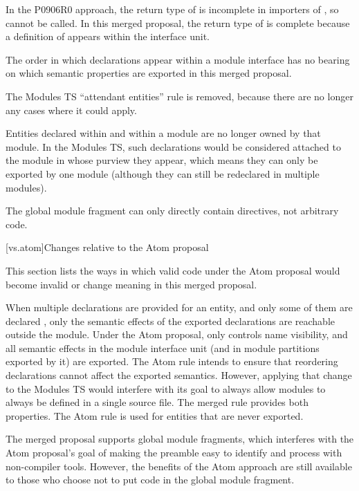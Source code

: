 In the P0906R0 approach,
the return type of  is incomplete
in importers of ,
so  cannot be called.
In this merged proposal,
the return type of  is complete
because a definition of 
appears within the interface unit.
\begin{note}
The order in which declarations appear within a module interface
has no bearing on which semantic properties are exported
in this merged proposal.
\end{note}

The Modules TS ``attendant entities'' rule is removed,
because there are no longer any cases where it could apply.

\pnum
Entities declared within  and 
within a module are no longer owned by that module.
In the Modules TS, such declarations would be considered attached
to the module in whose purview they appear,
which means they can only be exported by one module
(although they can still be redeclared in multiple modules).

\pnum
The global module fragment can only
directly contain  directives,
not arbitrary code.

[vs.atom]{Changes relative to the Atom proposal}

\pnum
This section lists the ways in which valid code under the Atom proposal
would become invalid or change meaning in this merged proposal.

\pnum
When multiple declarations are provided for an entity,
and only some of them are declared ,
only the semantic effects of the exported declarations
are reachable outside the module.
Under the Atom proposal,
 only controls name visibility,
and all semantic effects in the module interface unit
(and in module partitions exported by it)
are exported.
The Atom rule intends to ensure that
reordering declarations cannot affect the exported semantics.
However, applying that change to the Modules TS
would interfere with its goal to always allow modules
to always be defined in a single source file.
The merged rule provides both properties.
The Atom rule is used for entities that are never exported.

\pnum
The merged proposal supports global module fragments,
which interferes with the Atom proposal's goal
of making the preamble easy to identify and process
with non-compiler tools.
However, the benefits of the Atom approach are still available
to those who choose not to put code in the global module fragment.

